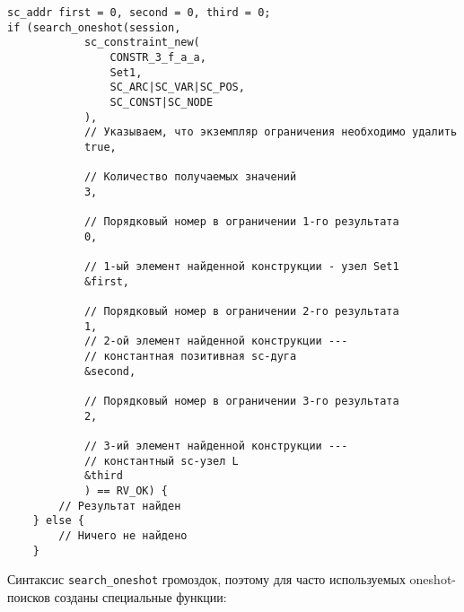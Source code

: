 \begin{lstlisting}[texcl]
sc_addr first = 0, second = 0, third = 0; 
if (search_oneshot(session,
            sc_constraint_new(
                CONSTR_3_f_a_a,
                Set1,
                SC_ARC|SC_VAR|SC_POS,
                SC_CONST|SC_NODE
            ),
            // Указываем, что экземпляр ограничения необходимо удалить
            true,

            // Количество получаемых значений
            3,

            // Порядковый номер в ограничении 1-го результата
            0,
            
            // 1-ый элемент найденной конструкции - узел Set1
            &first,
            
            // Порядковый номер в ограничении 2-го результата
            1,
            // 2-ой элемент найденной конструкции ---
            // константная позитивная sc-дуга
            &second,

            // Порядковый номер в ограничении 3-го результата
            2,
            
            // 3-ий элемент найденной конструкции ---
            // константный sc-узел L
            &third
            ) == RV_OK) {
        // Результат найден
    } else {
        // Ничего не найдено
    }
\end{lstlisting}

Синтаксис \lstinline|search_oneshot| громоздок, поэтому для часто
используемых oneshot-поисков созданы специальные функции:

